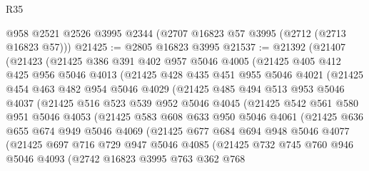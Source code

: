 \begin{lexlean}{R35}
\begin{coremodule}
    @958
    @2521
    @2526
    @3995
    @2344
    (@2707 @16823 @57 @3995 (@2712 (@2713 @16823 @57)))
@21425 := @2805 @16823 @3995
@21537 := @21392
    (@21407
      (@21423
        (@21425
          @386
          @391
          @402
          @957
          @5046
          @4005
          (@21425
            @405
            @412
            @425
            @956
            @5046
            @4013
            (@21425
              @428
              @435
              @451
              @955
              @5046
              @4021
              (@21425
                @454
                @463
                @482
                @954
                @5046
                @4029
                (@21425
                  @485
                  @494
                  @513
                  @953
                  @5046
                  @4037
                  (@21425
                    @516
                    @523
                    @539
                    @952
                    @5046
                    @4045
                    (@21425
                      @542
                      @561
                      @580
                      @951
                      @5046
                      @4053
                      (@21425
                        @583
                        @608
                        @633
                        @950
                        @5046
                        @4061
                        (@21425
                          @636
                          @655
                          @674
                          @949
                          @5046
                          @4069
                          (@21425
                            @677
                            @684
                            @694
                            @948
                            @5046
                            @4077
                            (@21425
                              @697
                              @716
                              @729
                              @947
                              @5046
                              @4085
                              (@21425
                                @732
                                @745
                                @760
                                @946
                                @5046
                                @4093
                                (@2742
                                  @16823
                                  @3995
                                  @763
                                  @362
                                  @768

\end{coremodule}
\end{lexlean}
